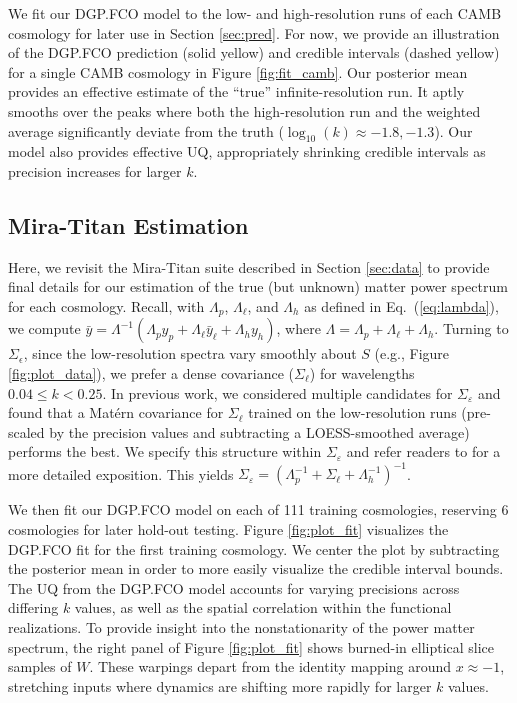 \documentclass[11pt]{article}
\begin{document}
We fit our DGP.FCO model to the low- and high-resolution runs of each CAMB cosmology for
later use in Section \ref{sec:pred}.  For now, we provide an illustration of the DGP.FCO
prediction (solid yellow) and credible intervals (dashed yellow) for a single 
CAMB cosmology in Figure \ref{fig:fit_camb}.  Our posterior mean provides an effective estimate
of the ``true'' infinite-resolution run.  It aptly smooths over the peaks where 
both the high-resolution run and the weighted average significantly deviate from the truth
($\log_{10}(k)\approx -1.8,-1.3$). Our model also provides effective UQ, appropriately shrinking
credible intervals as precision increases for larger $k$.

\subsection{Mira-Titan Estimation}
\label{subsec:mira_fit}

Here, we revisit the Mira-Titan suite described in Section \ref{sec:data} to provide
final details for our estimation of the true (but unknown) matter power spectrum for
each cosmology.  Recall, with $\Lambda_p$, $\Lambda_\ell$, and $\Lambda_h$ as 
defined in Eq.~(\ref{eq:lambda}), we compute
$\bar y = \Lambda^{-1}(\Lambda_p y_p + \Lambda_{\ell} \bar{y}_\ell + \Lambda_h y_h)$, 
where $\Lambda = \Lambda_p + \Lambda_\ell + \Lambda_h$.
Turning to $\Sigma_\epsilon$, since the low-resolution spectra 
vary smoothly about $S$ (e.g., Figure \ref{fig:plot_data}), we prefer a dense 
covariance ($\Sigma_\ell$) for wavelengths $0.04 \leq k < 0.25$.
In previous work, we considered multiple candidates for 
$\Sigma_\varepsilon$ \citep{walsh2023bayesian} and found that a Mat\'ern covariance 
for $\Sigma_\ell$ trained on the low-resolution runs (pre-scaled by the precision 
values and subtracting a LOESS-smoothed average) performs the best. 
We specify this structure within $\Sigma_\varepsilon$ and refer readers 
to \cite{walsh2023bayesian} for a more detailed exposition. This yields 
$\Sigma_\varepsilon=\left(\Lambda_p^{-1} + \Sigma_\ell + \Lambda_h^{-1}\right)^{-1}$.

We then fit our DGP.FCO model on each of 111 training cosmologies, reserving 6 cosmologies
for later hold-out testing.  Figure \ref{fig:plot_fit} 
visualizes the DGP.FCO fit for the first training cosmology.  We center the plot
by subtracting the posterior mean in order to more easily visualize the credible
interval bounds.  The UQ from the DGP.FCO model accounts for varying precisions 
across differing $k$ values, as well as the spatial correlation within the 
functional realizations.  To provide insight into the nonstationarity of the power
matter spectrum, the right panel of Figure \ref{fig:plot_fit} shows burned-in elliptical 
slice samples of $W$.
These warpings depart from the identity mapping around $x\approx-1$, 
stretching inputs where dynamics are shifting more rapidly for larger $k$ values.
\end{document}

